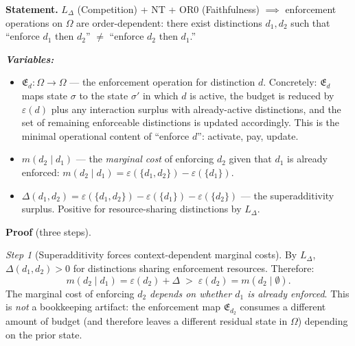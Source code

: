 \documentclass[11pt]{article}
\newenvironment{varlist}{\begin{itemize}[nosep,leftmargin=2em]}{\end{itemize}}
\begin{document}
\begin{tcolorbox}[apfbox, title={Theorem T1 --- The Bridge Theorem (Order-Dependence)}]
\textbf{Statement.}  $L_\Delta$ (Competition) + NT + OR0 (Faithfulness) $\implies$ enforcement operations on $\Omega$ are order-dependent: there exist distinctions $d_1, d_2$ such that ``enforce $d_1$ then $d_2$'' $\ne$ ``enforce $d_2$ then $d_1$.''

\smallskip\noindent\textbf{\textit{Variables:}}
\begin{varlist}
\item $\mathfrak{E}_{d}: \Omega \to \Omega$ --- the enforcement operation for distinction $d$.  Concretely: $\mathfrak{E}_d$ maps state $\sigma$ to the state $\sigma'$ in which $d$ is active, the budget is reduced by $\varepsilon(d)$ plus any interaction surplus with already-active distinctions, and the set of remaining enforceable distinctions is updated accordingly.  This is the minimal operational content of ``enforce $d$'': activate, pay, update.
\item $m(d_2 \mid d_1)$ --- the \emph{marginal cost} of enforcing $d_2$ given that $d_1$ is already enforced: $m(d_2 \mid d_1) = \varepsilon(\{d_1, d_2\}) - \varepsilon(\{d_1\})$.
\item $\Delta(d_1, d_2) = \varepsilon(\{d_1, d_2\}) - \varepsilon(\{d_1\}) - \varepsilon(\{d_2\})$ --- the superadditivity surplus.  Positive for resource-sharing distinctions by $L_\Delta$.
\end{varlist}

\smallskip\noindent\textbf{Proof} (three steps).

\textit{Step 1} (Superadditivity forces context-dependent marginal costs).  By $L_\Delta$, $\Delta(d_1, d_2) > 0$ for distinctions sharing enforcement resources.  Therefore:
\begin{equation}
m(d_2 \mid d_1) = \varepsilon(d_2) + \Delta \;>\; \varepsilon(d_2) = m(d_2 \mid \emptyset).
\end{equation}
The marginal cost of enforcing $d_2$ \emph{depends on whether $d_1$ is already enforced}.  This is \emph{not} a bookkeeping artifact: the enforcement map $\mathfrak{E}_{d_2}$ consumes a different amount of budget (and therefore leaves a different residual state in $\Omega$) depending on the prior state.


\end{tcolorbox}
\end{document}
